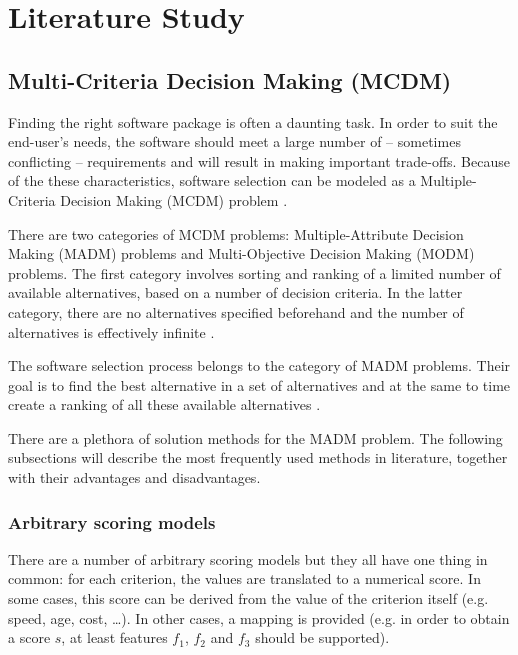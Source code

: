 \chapter{Literature Study}
\label{chap:literature}


\section{Multi-Criteria Decision Making (MCDM)}
\label{sec:mcdm}

Finding the right software package is often a daunting task. In order to suit the end-user's needs, the software should meet a large number of -- sometimes conflicting -- requirements and will result in making important trade-offs. Because of the these characteristics, software selection can be modeled as a Multiple-Criteria Decision Making (MCDM) problem \cite{Jadhav:2009, Jadhav:2011}.

There are two categories of MCDM problems: Multiple-Attribute Decision Making (MADM) problems and Multi-Objective Decision Making (MODM) problems. The first category involves sorting and ranking of a limited number of available alternatives, based on a number of decision criteria. In the latter category, there are no alternatives specified beforehand and the number of alternatives is effectively infinite \cite{Kahraman:2008}. 

The software selection process belongs to the category of MADM problems. Their goal is to find the best alternative in a set of alternatives and at the same to time create a ranking of all these available alternatives \TODO{\cite{}}. %

There are a plethora of solution methods for the MADM problem. The following subsections will describe the most frequently used methods in literature, together with their advantages and disadvantages. 


\subsection{Arbitrary scoring models} 

There are a number of arbitrary scoring models but they all have one thing in common: for each criterion, the values are translated to a numerical score. In some cases, this score can be derived from the value of the criterion itself (e.g. speed, age, cost, \ldots). In other cases, a mapping is provided (e.g. in order to obtain a score $s$, at least features $f_1$, $f_2$ and $f_3$ should be supported).

